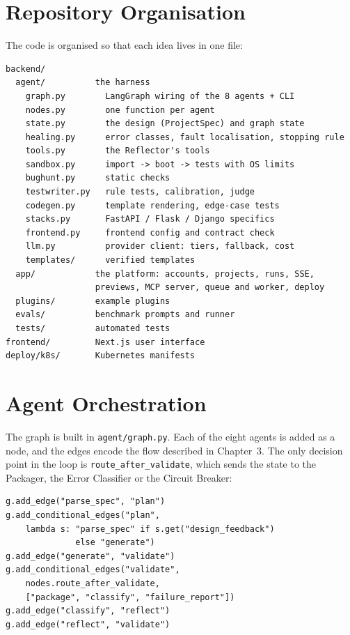 \documentclass[12pt,a4paper]{report}
\begin{document}
\section{Repository Organisation}

The code is organised so that each idea lives in one file:

\begin{singlespace}
\begin{verbatim}
backend/
  agent/          the harness
    graph.py        LangGraph wiring of the 8 agents + CLI
    nodes.py        one function per agent
    state.py        the design (ProjectSpec) and graph state
    healing.py      error classes, fault localisation, stopping rule
    tools.py        the Reflector's tools
    sandbox.py      import -> boot -> tests with OS limits
    bughunt.py      static checks
    testwriter.py   rule tests, calibration, judge
    codegen.py      template rendering, edge-case tests
    stacks.py       FastAPI / Flask / Django specifics
    frontend.py     frontend config and contract check
    llm.py          provider client: tiers, fallback, cost
    templates/      verified templates
  app/            the platform: accounts, projects, runs, SSE,
                  previews, MCP server, queue and worker, deploy
  plugins/        example plugins
  evals/          benchmark prompts and runner
  tests/          automated tests
frontend/         Next.js user interface
deploy/k8s/       Kubernetes manifests
\end{verbatim}
\end{singlespace}

\section{Agent Orchestration}

The graph is built in \texttt{agent/graph.py}. Each of the eight agents is added as a node, and the edges encode the flow described in Chapter~3. The only decision point in the loop is \texttt{route\_after\_validate}, which sends the state to the Packager, the Error Classifier or the Circuit Breaker:

\begin{singlespace}
\begin{verbatim}
g.add_edge("parse_spec", "plan")
g.add_conditional_edges("plan",
    lambda s: "parse_spec" if s.get("design_feedback")
              else "generate")
g.add_edge("generate", "validate")
g.add_conditional_edges("validate",
    nodes.route_after_validate,
    ["package", "classify", "failure_report"])
g.add_edge("classify", "reflect")
g.add_edge("reflect", "validate")
\end{verbatim}
\end{singlespace}
\end{document}
